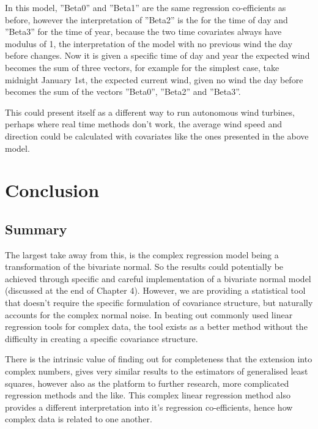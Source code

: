 \documentclass[honours,12pt]{unswthesis}
\numberwithin{equation}{section}
\begin{document}
\noindent In this model, ''Beta0'' and ''Beta1'' are the same regression co-efficients as before, however the interpretation of ''Beta2'' is the for the time of day and ''Beta3'' for the time of year, because the two time covariates always have modulus of 1, the interpretation of the model with no previous wind the day before changes. Now it is given a specific time of day and year the expected wind becomes the sum of three vectors, for example for the simplest case, take midnight January 1st, the expected current wind, given no wind the day before becomes the sum of the vectors ''Beta0'',  ''Beta2'' and  ''Beta3''.\par

This could present itself as a different way to run autonomous wind turbines, perhaps where real time methods don't work, the average wind speed and direction could be calculated with covariates like the ones presented in the above model.



\chapter{Conclusion}\label{ccl}

\section{Summary}

The largest take away from this, is the complex regression model being a transformation of the bivariate normal. So the results could potentially be achieved through specific and careful implementation of a bivariate normal model (discussed at the end of Chapter 4). However, we are providing a statistical tool that doesn't require the specific formulation of covariance structure, but naturally accounts for the complex normal noise. In beating out commonly used linear regression tools for complex data, the tool exists as a better method without the difficulty in creating a specific covariance structure.\par
There is the intrinsic value of finding out for completeness that the extension into complex numbers, gives very similar results to the estimators of generalised least squares, however also as the platform to further research, more complicated regression methods and the like. This complex linear regression method also provides a different interpretation into it's regression co-efficients, hence how complex data is related to one another.
\end{document}
